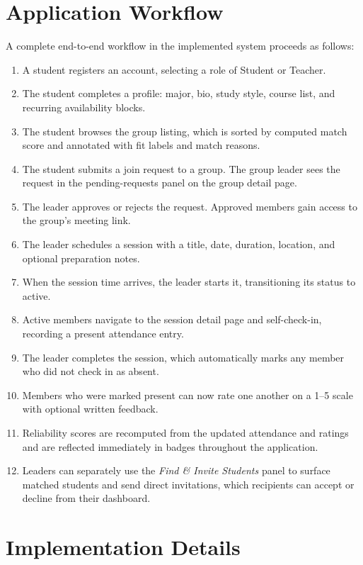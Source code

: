 \documentclass[conference]{IEEEtran}
\begin{document}
\section{Application Workflow}
A complete end-to-end workflow in the implemented system proceeds as follows:
\begin{enumerate}
    \item A student registers an account, selecting a role of Student or Teacher.
    \item The student completes a profile: major, bio, study style, course list, and recurring availability blocks.
    \item The student browses the group listing, which is sorted by computed match score and annotated with fit labels and match reasons.
    \item The student submits a join request to a group. The group leader sees the request in the pending-requests panel on the group detail page.
    \item The leader approves or rejects the request. Approved members gain access to the group's meeting link.
    \item The leader schedules a session with a title, date, duration, location, and optional preparation notes.
    \item When the session time arrives, the leader starts it, transitioning its status to active.
    \item Active members navigate to the session detail page and self-check-in, recording a present attendance entry.
    \item The leader completes the session, which automatically marks any member who did not check in as absent.
    \item Members who were marked present can now rate one another on a 1--5 scale with optional written feedback.
    \item Reliability scores are recomputed from the updated attendance and ratings and are reflected immediately in badges throughout the application.
    \item Leaders can separately use the \textit{Find \& Invite Students} panel to surface matched students and send direct invitations, which recipients can accept or decline from their dashboard.
\end{enumerate}

\section{Implementation Details}
\end{document}
